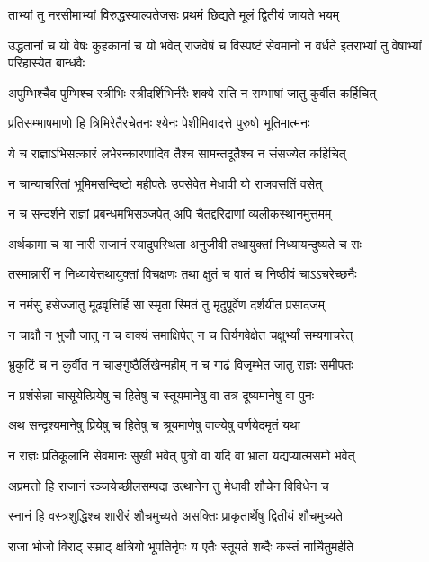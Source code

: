 \twolineshloka
{ताभ्यां तु नरसीमाभ्यां विरुद्धस्याल्पतेजसः}
{प्रथमं छिद्यते मूलं द्वितीयं जायते भयम्}


\threelineshloka
{उद्धतानां च यो वेषः कुहकानां च यो भवेत्}
{राजवेषं च विस्पष्टं सेवमानो न वर्धते}
{इतराभ्यां तु वेषाभ्यां परिहास्येत बान्धवैः}


\twolineshloka
{अपुम्भिश्चैव पुम्भिश्च स्त्रीभिः स्त्रीदर्शिभिर्नरैः}
{शक्ये सति न सम्भाषां जातु कुर्वीत कर्हिचित्}


\twolineshloka
{प्रतिसम्भाषमाणो हि त्रिभिरेतैरचेतनः}
{श्येनः पेशीमिवादत्ते पुरुषो भूतिमात्मनः}


\twolineshloka
{ये च राज्ञाऽभिसत्कारं लभेरन्कारणादिव}
{तैश्च सामन्तदूतैश्च न संसज्येत कर्हिचित्}


\twolineshloka
{न चान्याचरितां भूमिमसन्दिष्टो महीपतेः}
{उपसेवेत मेधावी यो राजवसतिं वसेत्}


\twolineshloka
{न च सन्दर्शने राज्ञां प्रबन्धमभिसञ्जपेत्}
{अपि चैतद्दरिद्राणां व्यलीकस्थानमुत्तमम्}


\twolineshloka
{अर्थकामा च या नारी राजानं स्यादुपस्थिता}
{अनुजीवी तथायुक्तां निध्यायन्दुष्यते च सः}


\twolineshloka
{तस्मान्नारीं न निध्यायेत्तथायुक्तां विचक्षणः}
{तथा क्षुतं च वातं च निष्ठीवं चाऽऽचरेच्छनैः}


\twolineshloka
{न नर्मसु हसेज्जातु मूढवृत्तिर्हि सा स्मृता}
{स्मितं तु मृदुपूर्वेण दर्शयीत प्रसादजम्}


\twolineshloka
{न चाक्षौ न भुजौ जातु न च वाक्यं समाक्षिपेत्}
{न च तिर्यगवेक्षेत चक्षुर्भ्यां सम्यगाचरेत्}


\twolineshloka
{भ्रुकुटिं च न कुर्वीत न चाङ्गुष्ठैर्लिखेन्महीम्}
{न च गाढं विजृम्भेत जातु राज्ञः समीपतः}


\twolineshloka
{न प्रशंसेन्ना चासूयेत्प्रियेषु च हितेषु च}
{स्तूयमानेषु वा तत्र दूष्यमानेषु वा पुनः}


\twolineshloka
{अथ सन्दृश्यमानेषु प्रियेषु च हितेषु च}
{श्रूयमाणेषु वाक्येषु वर्णयेदमृतं यथा}


\twolineshloka
{न राज्ञः प्रतिकूलानि सेवमानः सुखी भवेत्}
{पुत्रो वा यदि वा भ्राता यद्यप्यात्मसमो भवेत्}


\twolineshloka
{अप्रमत्तो हि राजानं रञ्जयेच्छीलसम्पदा}
{उत्थानेन तु मेधावी शौचेन विविधेन च}


\twolineshloka
{स्नानं हि वस्त्रशुद्धिश्च शारीरं शौचमुच्यते}
{असक्तिः प्राकृतार्थेषु द्वितीयं शौचमुच्यते}


\twolineshloka
{राजा भोजो विराट् सम्राट् क्षत्रियो भूपतिर्नृपः}
{य एतैः स्तूयते शब्दैः कस्तं नार्चितुमर्हति}


